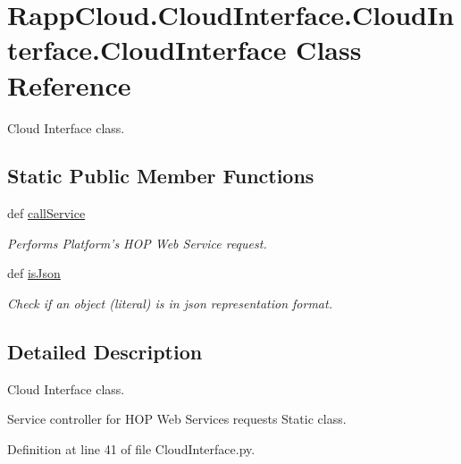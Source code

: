 \hypertarget{classRappCloud_1_1CloudInterface_1_1CloudInterface_1_1CloudInterface}{\section{Rapp\-Cloud.\-Cloud\-Interface.\-Cloud\-Interface.\-Cloud\-Interface Class Reference}
\label{classRappCloud_1_1CloudInterface_1_1CloudInterface_1_1CloudInterface}
}


Cloud Interface class.  


\subsection*{Static Public Member Functions}
\begin{DoxyCompactItemize}
\item 
def \hyperlink{classRappCloud_1_1CloudInterface_1_1CloudInterface_1_1CloudInterface_a65afc3f6348cecf7ea910e7500d6216d}{call\-Service}
\begin{DoxyCompactList}\small\item\em Performs Platform's H\-O\-P Web Service request. \end{DoxyCompactList}\item 
def \hyperlink{classRappCloud_1_1CloudInterface_1_1CloudInterface_1_1CloudInterface_a9789e50a5ecd0978f7ea9d9fdef75c48}{is\-Json}
\begin{DoxyCompactList}\small\item\em Check if an object (literal) is in json representation format. \end{DoxyCompactList}\end{DoxyCompactItemize}


\subsection{Detailed Description}
Cloud Interface class. 

Service controller for H\-O\-P Web Services requests Static class. 

Definition at line 41 of file Cloud\-Interface.\-py.



